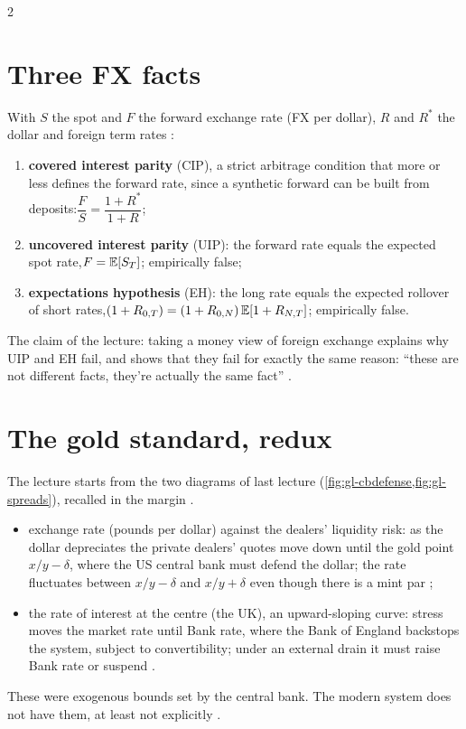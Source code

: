 \begin{paracol}{2}
\section{Three FX facts}\label{sec:fx-facts}

\begin{keyformulas}
With $S$ the spot and $F$ the forward exchange rate (FX per dollar), $R$ and $R^\ast$ the dollar and foreign term rates :
\begin{enumerate}
  \item \textbf{covered interest parity} (CIP), a strict arbitrage condition that more or less defines the forward rate, since a synthetic forward can be built
        from deposits:\quad $\dfrac{F}{S}=\dfrac{1+R^\ast}{1+R}$;
  \item \textbf{uncovered interest parity} (UIP): the forward rate equals the expected spot rate,\quad $F=\mathbb{E}[S_T]$; empirically false;
  \item \textbf{expectations hypothesis} (EH): the long rate equals the expected rollover of short rates,\quad $(1+R_{0,T}) = (1+R_{0,N})\,\mathbb{E}[1+R_{N,T}]$; empirically
        false.
\end{enumerate}
\end{keyformulas}

The claim of the lecture: taking a money view of foreign exchange explains why UIP and EH fail, and shows that they fail for exactly the same reason:
``these are not different facts, they're actually the same fact'' .

\section{The gold standard, redux}\label{sec:fx-redux}

The lecture starts from the two diagrams of last lecture (\cref{fig:gl-cbdefense,fig:gl-spreads}), recalled in the margin .
\begin{recall}
\begin{itemize}
  \item exchange rate (pounds per dollar) against the dealers' liquidity risk: as the dollar depreciates the private dealers' quotes move down until the gold
        point $x/y-\delta$, where the US central bank must defend the dollar; the rate fluctuates between $x/y-\delta$ and $x/y+\delta$ even though there is a mint
        par ;
  \item the rate of interest at the centre (the UK), an upward-sloping curve: stress moves the market rate until Bank rate, where the Bank of England backstops
        the system, subject to convertibility; under an external drain it must raise Bank rate or suspend .
\end{itemize}
\end{recall}
These were exogenous bounds set by the central bank. The modern system does not have them, at least not explicitly .


\end{paracol}
